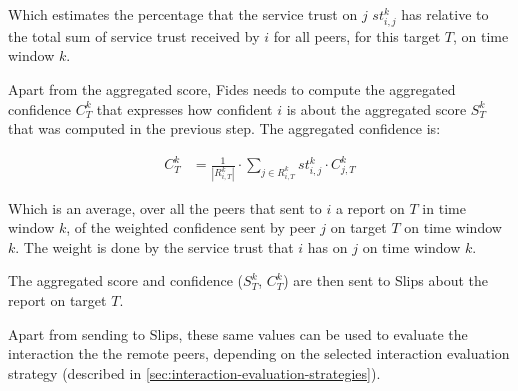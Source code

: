 Which estimates the percentage that the service trust on $j$ $st^{k}_{i, j}$ has relative to the total sum of service trust received by $i$ for all peers, for this target $T$, on time window $k$.

Apart from the aggregated score, Fides needs to compute the aggregated confidence $C^{k}_{T}$ that expresses how confident $i$ is about the aggregated score $S^{k}_{T}$ that was computed in the previous step. The aggregated confidence is:

\begin{equation}
\begin{split}
    C^{k}_{T} &= \frac{1}{|R^{k}_{i, T}|} \cdot \sum_{{j}\in R^{k}_{i, T}} st^{k}_{i, j} \cdot C^{k}_{j, T}
\end{split}
\end{equation}

Which is an average, over all the peers that sent to $i$ a report on $T$ in time window $k$, of the weighted confidence sent by peer $j$ on target $T$ on time window $k$. The weight is done by the service trust that $i$ has on $j$ on time window $k$.


The aggregated score and confidence ($S^{k}_{T}$, $C^{k}_{T}$) are then sent to Slips about the report on target $T$.

Apart from sending to Slips, these same values can be used to evaluate the interaction the the remote peers, depending on the selected interaction evaluation strategy (described in \ref{sec:interaction-evaluation-strategies}).